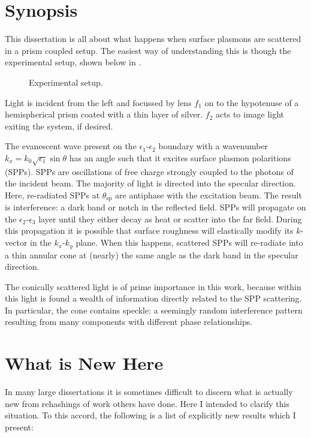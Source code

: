 \documentclass[a4paper,titlepage,onecolumn]{report}
\begin{document}
\section{Synopsis}
This dissertation is all about what happens when surface plasmons are
scattered in a prism coupled setup.  The easiest way of understanding this
is though the experimental setup, shown below in .  
\begin{figure}[hb]
\centering

\vspace{-1cm}
\caption{
Experimental setup.
} 
\label{fig:kretschmanngeo} 
\end{figure}
Light is incident from the left and focussed by lens $f_1$ on to the
hypotenuse of a hemispherical prism coated with a thin layer of silver.
$f_2$ acts to image light exiting the system, if desired.

The evanescent wave present on the $\epsilon_1$-$\epsilon_2$ boundary with
a wavenumber $k_x = k_0\sqrt{\epsilon_1}\sin \theta$ has an angle such that
it excites surface plasmon polaritions (SPPs).  SPPs are oscillations of
free charge strongly coupled to the photons of the incident beam.  The
majority of light is directed into the specular direction.  Here,
re-radiated SPPs at $\theta_\mathrm{sp}$ are antiphase with the excitation
beam.  The result is interference: a dark band or notch in the reflected
field.  SPPs will propagate on the $\epsilon_2$-$\epsilon_3$ layer until
they either decay as heat or scatter into the far field.  During this
propagation it is possible that surface roughness will elastically modify
its $k$-vector in the $k_x$-$k_y$ plane.  When this happens, scattered SPPs
will re-radiate into a thin annular cone at (nearly) the same angle as the
dark band in the specular direction.

The conically scattered light is of prime importance in this work, because
within this light is found a wealth of information directly related to the
SPP scattering.  In particular, the cone contains speckle: a seemingly
random interference pattern resulting from many components with different
phase relationships.

\section{What is New Here}
In many large dissertations it is sometimes difficult to discern what is
actually new from rehashings of work others have done.  Here I intended to
clarify this situation.  To this accord, the following is a list of
explicitly new results which I present:
\end{document}
